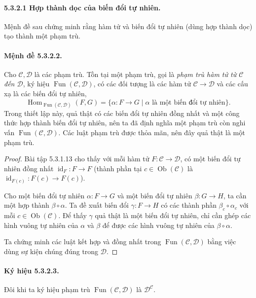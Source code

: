 \paragraph{5.3.2.1 Hợp thành dọc của biến đổi tự nhiên.} Mệnh đề sau chứng minh rằng hàm tử và biến đổi tự nhiên (dùng hợp thành dọc) tạo thành một phạm trù.
\paragraph{Mệnh đề 5.3.2.2.} Cho $\mathcal C,\mathcal D$ là các phạm trù. Tồn tại một phạm trù, gọi là \emph{phạm trù hàm tử từ $\mathcal C$ đến $\mathcal D$}, ký hiệu $\operatorname{Fun}(\mathcal C,\mathcal D)$, có các đối tượng là các hàm tử $\mathcal C\to\mathcal D$ và các cấu xạ là các biến đổi tự nhiên,
\[\operatorname{Hom}_{\operatorname{Fun}(\mathcal C,\mathcal D)}(F,G)=\{\alpha:F\to G\mid\alpha\text{ là một biến đổi tự nhiên}\}.\]
Trong thiết lập này, quả thật có các biến đổi tự nhiên đồng nhất và một công thức hợp thành biến đổi tự nhiên, nên ta đã định nghĩa một phạm trù còn nghi vấn $\operatorname{Fun}(\mathcal C,\mathcal D)$. Các luật phạm trù được thỏa mãn, nên đây quả thật là một phạm trù.
\begin{proof}Bài tập 5.3.1.13 cho thấy với mỗi hàm tử $F:\mathcal C\to\mathcal D$, có một biến đổi tự nhiên đồng nhất $\operatorname{id}_F:F\to F$ (thành phần tại $c\in\operatorname{Ob}(\mathcal C)$ là $\operatorname{id}_{F(c)}:F(c)\to F(c)$).

Cho một biến đổi tự nhiên $\alpha:F\to G$ và một biến đổi tự nhiên $\beta:G\to H$, ta cần một hợp thành $\beta\circ\alpha$. Ta đề xuất biến đổi $\gamma:F\to H$ có các thành phần $\beta_c\circ\alpha_c$ với mỗi $c\in\operatorname{Ob}(\mathcal C)$. Để thấy $\gamma$ quả thật là một biến đổi tự nhiên, chỉ cần ghép các hình vuông tự nhiên của $\alpha$ và $\beta$ để được các hình vuông tự nhiên của $\beta\circ\alpha$.

Ta chứng minh các luật kết hợp và đồng nhất trong $\operatorname{Fun}(\mathcal C,\mathcal D)$ bằng việc dùng sự kiện chúng đúng trong $\mathcal D$.\end{proof}
\paragraph{Ký hiệu 5.3.2.3.} Đôi khi ta ký hiệu phạm trù $\operatorname{Fun}(\mathcal C,\mathcal D)$ là $\mathcal D^{\mathcal C}$.
